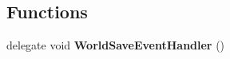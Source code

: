 \subsection*{Functions}
\begin{DoxyCompactItemize}
\item 
\hypertarget{namespace_s_e_mod_a_p_i_internal_1_1_a_p_i_1_1_common_a1edfa76eca9045450c2885b4a4281a40}{}delegate void {\bfseries World\+Save\+Event\+Handler} ()\label{namespace_s_e_mod_a_p_i_internal_1_1_a_p_i_1_1_common_a1edfa76eca9045450c2885b4a4281a40}

\end{DoxyCompactItemize}
